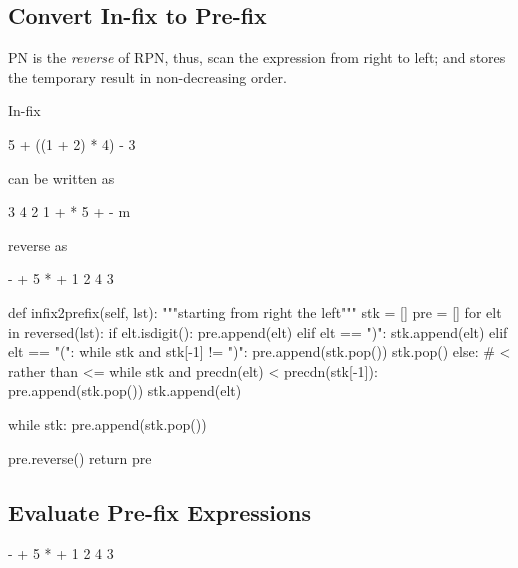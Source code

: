 \subsection{Convert In-fix to Pre-fix}
PN is the \textit{reverse} of RPN, thus, scan the expression from right to left; and  stores the temporary result in non-decreasing order. 


In-fix
\begin{python}
5 + ((1 + 2) * 4) - 3
\end{python}

can be written as
\begin{python}
3 4 2 1 + * 5 + - m
\end{python}

reverse as 
\begin{python}
- + 5 * + 1 2 4 3
\end{python}

\begin{python}
  def infix2prefix(self, lst):
    """starting from right the left"""
    stk = []
    pre = []
    for elt in reversed(lst):
      if elt.isdigit():
        pre.append(elt)
      elif elt == ")":
        stk.append(elt)
      elif elt == "(":
        while stk and stk[-1] != ")":
          pre.append(stk.pop())
        stk.pop()
      else:
        # < rather than <=
        while stk and precdn(elt) < precdn(stk[-1]):  
          pre.append(stk.pop())
        stk.append(elt)

    while stk:
      pre.append(stk.pop())

    pre.reverse()
    return pre
\end{python}


\subsection{Evaluate Pre-fix Expressions}
\begin{python}
- + 5 * + 1 2 4 3
\end{python}
